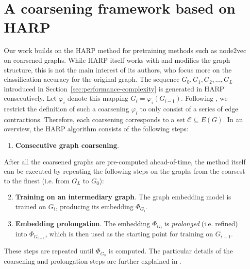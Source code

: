 \section{A coarsening framework based on HARP}\label{sec:harp}

Our work builds on the HARP method \cite{chen_harp_2018} for pretraining methods such as node2vec \cite{grover_node2vec_2016} on coarsened graphs. While HARP itself works with and modifies the graph structure, this is not the main interest of its authors, who focus more on the classification accuracy for the original graph. The sequence \( G_0, G_1, G_2, \dots, G_L \) introduced in Section~\ref{sec:performance-complexity} is generated in HARP consecutively. Let \( \varphi_i \) denote this mapping \( G_i = \varphi_i \left( G_{i - 1} \right) \). Following \cite{schulz_mining_2019}, we restrict the definition of such a coarsening \( \varphi_i \) to only consist of a series of edge contractions. Therefore, each coarsening corresponds to a set \( \mathcal{C} \subseteq E \left( G \right) \). In an overview, the HARP algorithm consists of the following steps:

\begin{enumerate}
  \item \textbf{Consecutive graph coarsening}.
\end{enumerate}
After all the coarsened graphs are pre-computed ahead-of-time, the method itself can be executed by repeating the following steps on the graphs from the coarsest to the finest (i.e. from \( G_L \) to \( G_0 \)):
\begin{enumerate}\setcounter{enumi}{1}
  \item \textbf{Training on an intermediary graph}. The graph embedding model is trained on \( G_i \), producing its embedding \( \Phi_{G_i} \).
  \item \textbf{Embedding prolongation}. The embedding \( \Phi_{G_i} \) is \textit{prolonged} (i.e. refined) into \( \Phi_{G_{i - 1}} \), which is then used as the starting point for training on \( G_{i - 1} \).
\end{enumerate}
These steps are repeated until \( \Phi_{G_0} \) is computed. The particular details of the coarsening and prolongation steps are further explained in \cite{chen_harp_2018}.

